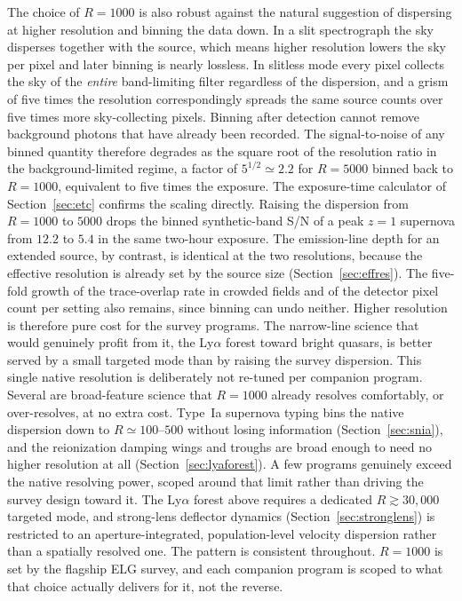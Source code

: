 \documentclass[10pt,onecolumn]{article}
\begin{document}
The choice of $R=1000$ is also robust against the natural suggestion of dispersing at higher resolution and binning the data down. In a slit spectrograph the sky disperses together with the source, which means higher resolution lowers the sky per pixel and later binning is nearly lossless. In slitless mode every pixel collects the sky of the \emph{entire} band-limiting filter regardless of the dispersion, and a grism of five times the resolution correspondingly spreads the same source counts over five times more sky-collecting pixels. Binning after detection cannot remove background photons that have already been recorded. The signal-to-noise of any binned quantity therefore degrades as the square root of the resolution ratio in the background-limited regime, a factor of $5^{1/2}\simeq2.2$ for $R=5000$ binned back to $R=1000$, equivalent to five times the exposure. The exposure-time calculator of Section~\ref{sec:etc} confirms the scaling directly. Raising the dispersion from $R=1000$ to $5000$ drops the binned synthetic-band S/N of a peak $z=1$ supernova from $12.2$ to $5.4$ in the same two-hour exposure. The emission-line depth for an extended source, by contrast, is identical at the two resolutions, because the effective resolution is already set by the source size (Section~\ref{sec:effres}). The five-fold growth of the trace-overlap rate in crowded fields and of the detector pixel count per setting also remains, since binning can undo neither. Higher resolution is therefore pure cost for the survey programs. The narrow-line science that would genuinely profit from it, the Ly$\alpha$ forest toward bright quasars, is better served by a small targeted mode than by raising the survey dispersion. This single native resolution is deliberately not re-tuned per companion program. Several are broad-feature science that $R=1000$ already resolves comfortably, or over-resolves, at no extra cost. Type~Ia supernova typing bins the native dispersion down to $R\simeq100$--$500$ without losing information (Section~\ref{sec:snia}), and the reionization damping wings and troughs are broad enough to need no higher resolution at all (Section~\ref{sec:lyaforest}). A few programs genuinely exceed the native resolving power, scoped around that limit rather than driving the survey design toward it. The Ly$\alpha$ forest above requires a dedicated $R\gtrsim30{,}000$ targeted mode, and strong-lens deflector dynamics (Section~\ref{sec:stronglens}) is restricted to an aperture-integrated, population-level velocity dispersion rather than a spatially resolved one. The pattern is consistent throughout. $R=1000$ is set by the flagship ELG survey, and each companion program is scoped to what that choice actually delivers for it, not the reverse.
\end{document}
